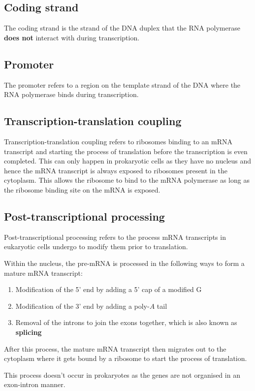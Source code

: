 \documentclass[11pt]{article}
\begin{document}
\subsection{Coding strand}
\label{sec:orgf596ff2}
The coding strand is the strand of the DNA duplex that the RNA polymerase \textbf{does not} interact with during transcription.
\subsection{Promoter}
\label{sec:org2306045}
The promoter refers to a region on the template strand of the DNA where the RNA polymerase binds during transcription.

\newpage
\subsection{Transcription-translation coupling}
\label{sec:orgce81d80}
Transcription-translation coupling refers to ribosomes binding to an mRNA transcript and starting the process of translation before the transcription is even completed. This can only happen in prokaryotic cells as they have no nucleus and hence the mRNA transcript is always exposed to ribosomes present in the cytoplasm. This allows the ribosome to bind to the mRNA polymerase as long as the ribosome binding site on the mRNA is exposed.
\subsection{Post-transcriptional processing}
\label{sec:org41bb66b}
Post-transcriptional processing refers to the process mRNA transcripts in eukaryotic cells undergo to modify them prior to translation.


Within the nucleus, the pre-mRNA is processed in the following ways to form a mature mRNA transcript:
\begin{enumerate}
\item Modification of the 5' end by adding a 5' cap of a modified G
\item Modification of the 3' end by adding a poly-\(A\) tail
\item Removal of the introns to join the exons together, which is also known as \textbf{splicing}
\end{enumerate}

After this process, the mature mRNA transcript then migrates out to the cytoplasm where it gets bound by a ribosome to start the process of translation.


This process doesn't occur in prokaryotes as the genes are not organised in an exon-intron manner.
\end{document}
